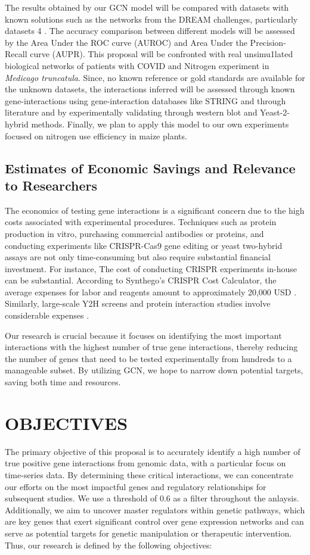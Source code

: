 \documentclass{article}
\begin{document}
The results obtained by our GCN model will be compared with datasets with known solutions such as the networks from the DREAM challenges, particularly datasets 4 \cite{dream}. The accuracy comparison between different models will be assessed by the Area Under the ROC curve (AUROC) and Area Under the Precision-Recall curve (AUPR). This proposal will be confronted with real unsimu1lated biological networks of patients with COVID and Nitrogen experiment in \textit{Medicago truncatula}. Since, no known reference or gold standards are available for the unknown datasets, the interactions inferred will be assessed through known gene-interactions using gene-interaction databases like STRING and through literature and by experimentally validating through western blot and Yeast-2-hybrid methods. Finally, we plan to apply this model to our own experiments focused on nitrogen use efficiency in maize plants.

\subsection{Estimates of Economic Savings and Relevance to Researchers}
The economics of testing gene interactions is a significant concern due to the high costs associated with experimental procedures. Techniques such as protein production in vitro, purchasing commercial antibodies or proteins, and conducting experiments like CRISPR-Cas9 gene editing or yeast two-hybrid assays are not only time-consuming but also require substantial financial investment. For instance, The cost of conducting CRISPR experiments in-house can be substantial. According to Synthego's CRISPR Cost Calculator, the average expenses for labor and reagents amount to approximately 20,000 USD \cite{synthego_calculator}. Similarly, large-scale Y2H screens and protein interaction studies involve considerable expenses \cite{thermofisher_crispr}.

Our research is crucial because it focuses on identifying the most important interactions with the highest number of true gene interactions, thereby reducing the number of genes that need to be tested experimentally from hundreds to a manageable subset. By utilizing GCN, we hope to narrow down potential targets, saving both time and resources.

\section{OBJECTIVES}
The primary objective of this proposal is to accurately identify a high number of true positive gene interactions from genomic data, with a particular focus on time-series data. By determining these critical interactions, we can concentrate our efforts on the most impactful genes and regulatory relationships for subsequent studies. We use a threshold of 0.6 as a filter throughout the anlaysis. Additionally, we aim to uncover master regulators within genetic pathways, which are key genes that exert significant control over gene expression networks and can serve as potential targets for genetic manipulation or therapeutic intervention. Thus, our research is defined by the following objectives:
\end{document}
